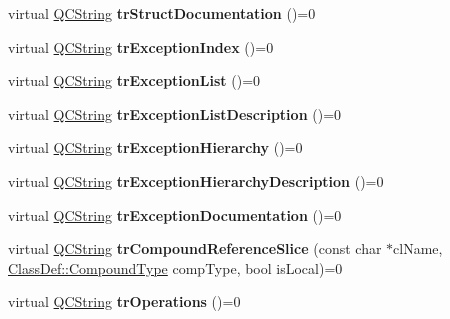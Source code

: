 \begin{DoxyCompactItemize}
virtual \mbox{\hyperlink{class_q_c_string}{Q\+C\+String}} {\bfseries tr\+Struct\+Documentation} ()=0
\item 
\mbox{\label{class_translator_af14c265f2ca13139eafc78bfb18f5712}} 
virtual \mbox{\hyperlink{class_q_c_string}{Q\+C\+String}} {\bfseries tr\+Exception\+Index} ()=0
\item 
\mbox{\label{class_translator_a89dbc7f478ddf76d905b1b7970a2216c}} 
virtual \mbox{\hyperlink{class_q_c_string}{Q\+C\+String}} {\bfseries tr\+Exception\+List} ()=0
\item 
\mbox{\label{class_translator_a2c8f86043c64d033441b709c0c341a36}} 
virtual \mbox{\hyperlink{class_q_c_string}{Q\+C\+String}} {\bfseries tr\+Exception\+List\+Description} ()=0
\item 
\mbox{\label{class_translator_a1226cf0f5e60e94ef1425f21ff2b6fd2}} 
virtual \mbox{\hyperlink{class_q_c_string}{Q\+C\+String}} {\bfseries tr\+Exception\+Hierarchy} ()=0
\item 
\mbox{\label{class_translator_a4c102c2109128b98e5f1b24aeacb370d}} 
virtual \mbox{\hyperlink{class_q_c_string}{Q\+C\+String}} {\bfseries tr\+Exception\+Hierarchy\+Description} ()=0
\item 
\mbox{\label{class_translator_a16ad7f78c8162a65fccab1bcd5b8e607}} 
virtual \mbox{\hyperlink{class_q_c_string}{Q\+C\+String}} {\bfseries tr\+Exception\+Documentation} ()=0
\item 
\mbox{\label{class_translator_afd5adf1ef36a44b9809b7b138cbb2ad2}} 
virtual \mbox{\hyperlink{class_q_c_string}{Q\+C\+String}} {\bfseries tr\+Compound\+Reference\+Slice} (const char $\ast$cl\+Name, \mbox{\hyperlink{class_class_def_ae70cf86d35fe954a94c566fbcfc87939}{Class\+Def\+::\+Compound\+Type}} comp\+Type, bool is\+Local)=0
\item 
\mbox{\label{class_translator_a66130cd9aafbf6efb3378941eaa24ea2}} 
virtual \mbox{\hyperlink{class_q_c_string}{Q\+C\+String}} {\bfseries tr\+Operations} ()=0
\item 
\mbox{\label{class_translator_a61fd045de7ecfa62a9c5281c130ca16b}} 

\end{DoxyCompactItemize}
